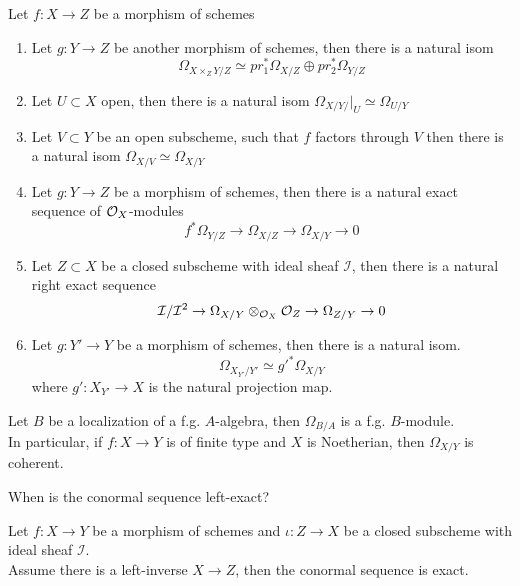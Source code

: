 \documentclass[../main.tex]{subfiles}
\begin{document}
\begin{propo}
Let $f:X\to Z$ be a morphism of schemes
\begin{enumerate}
\item Let $g:Y \to Z$ be another morphism of schemes, then there is a natural isom
	\[ 
	\Omega_{X \times_Z Y/ Z	} \simeq pr_1^{\ast}\Omega_{X /Z} \oplus pr_2^{\ast}\Omega_{Y /Z} 
	\]
\item Let $U \subset X$ open, then there is a natural isom
	$\Omega_{X / Y /}|_U \simeq \Omega_{ U /Y} $ 
\item Let $V \subset Y$ be an open subscheme, such that $f$ factors through $V$ then there is a natural isom $\Omega_{X /V} \simeq \Omega_{X/Y} $ 
\item Let $g:Y \to Z$ be a morphism of schemes, then there is a natural exact sequence of $\mathcal{O}_X$-modules
\[ 
f^{\ast}\Omega_{Y /Z} \to \Omega_{X /Z}  \to \Omega_{X /Y} \to 0
\]
\item Let $Z \subset X$ be a closed subscheme with ideal sheaf $ \mathcal{I}$, then there is a natural right exact sequence
	\[ 
	\mathcal{I} / \mathcal{I}^{2} \to \Omega_{X / Y} \otimes_{\mathcal{O}_X} \mathcal{O}_Z \to \Omega_{Z /Y} \to 0
	\]
	
\item Let $g:Y' \to Y$ be a morphism of schemes, then there is a natural isom.
	\[ 
	\Omega_{X_{Y'} / Y'} \simeq g'^{\ast}\Omega_{X /Y} 
	\]
	where $g': X_{Y'} \to X$ is the natural projection map.

\end{enumerate}
\end{propo}
\begin{crly}
Let $B$ be a localization of a f.g. $A$-algebra, then $\Omega_{B / A} $ is a f.g. $B$-module.\\
In particular, if $f:X\to Y$ is of finite type and $X$ is Noetherian, then $\Omega_{X /Y} $ is coherent.
\end{crly}
When is the conormal sequence left-exact?\\
\begin{propo}
Let $f:X\to Y$ be a morphism of schemes and $\iota:Z \to X$ be a closed subscheme with ideal sheaf $\mathcal{I}$.\\
Assume there is a left-inverse $X\to Z$, then the conormal sequence is exact.
\end{propo}
\end{document}
